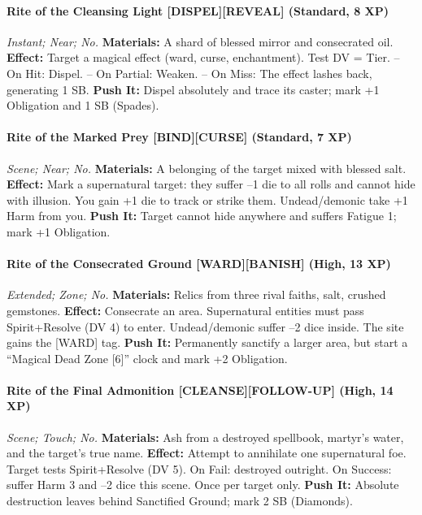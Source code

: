 \paragraph*{Rite of the Cleansing Light [DISPEL][REVEAL] (Standard, 8 XP)} \emph{Instant; Near; No.}  
\textbf{Materials:} A shard of blessed mirror and consecrated oil.  
\textbf{Effect:} Target a magical effect (ward, curse, enchantment). Test DV = Tier.  
– On Hit: Dispel.  
– On Partial: Weaken.  
– On Miss: The effect lashes back, generating 1 SB.  
\textbf{Push It:} Dispel absolutely and trace its caster; mark +1 Obligation and 1 SB (Spades).  

\paragraph*{Rite of the Marked Prey [BIND][CURSE] (Standard, 7 XP)} \emph{Scene; Near; No.}  
\textbf{Materials:} A belonging of the target mixed with blessed salt.  
\textbf{Effect:} Mark a supernatural target: they suffer –1 die to all rolls and cannot hide with illusion. You gain +1 die to track or strike them. Undead/demonic take +1 Harm from you.  
\textbf{Push It:} Target cannot hide anywhere and suffers Fatigue 1; mark +1 Obligation.  

\paragraph*{Rite of the Consecrated Ground [WARD][BANISH] (High, 13 XP)} \emph{Extended; Zone; No.}  
\textbf{Materials:} Relics from three rival faiths, salt, crushed gemstones.  
\textbf{Effect:} Consecrate an area. Supernatural entities must pass Spirit+Resolve (DV 4) to enter. Undead/demonic suffer –2 dice inside. The site gains the [WARD] tag.  
\textbf{Push It:} Permanently sanctify a larger area, but start a “Magical Dead Zone [6]” clock and mark +2 Obligation.  

\paragraph*{Rite of the Final Admonition [CLEANSE][FOLLOW-UP] (High, 14 XP)} \emph{Scene; Touch; No.}  
\textbf{Materials:} Ash from a destroyed spellbook, martyr’s water, and the target’s true name.  
\textbf{Effect:} Attempt to annihilate one supernatural foe. Target tests Spirit+Resolve (DV 5). On Fail: destroyed outright. On Success: suffer Harm 3 and –2 dice this scene. Once per target only.  
\textbf{Push It:} Absolute destruction leaves behind Sanctified Ground; mark 2 SB (Diamonds).  

